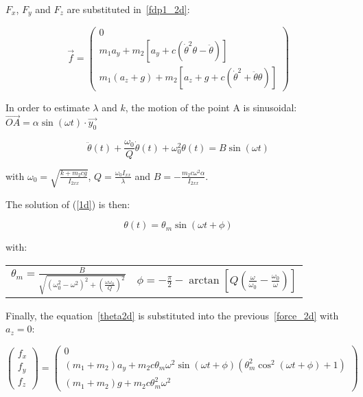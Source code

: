 \documentclass[\main/main.tex]{subfiles}
\begin{document}
$F_x$, $F_y$ and $F_z$ are substituted in~\eqref{fdp1_2d}:

\begin{equation}
  \label{force_2d}
  \overrightarrow{f}
  =
  \begin{pmatrix}
  0 \\
  m_1 a_y + m_2 [a_y + c (\dot{\theta}^2 \theta - \ddot{\theta})] \\
  m_1 (a_z + g) + m_2 [a_z + g + c (\dot{\theta}^2 + \ddot{\theta} \theta)]
  \end{pmatrix}
\end{equation}

In order to estimate $\lambda$ and $k$, the motion of the point A is sinusoidal: $\overrightarrow{OA} = \alpha \sin(\omega t) \cdot \overrightarrow{y_0}$

\begin{equation}
 \label{1d}
 \ddot{\theta}(t) + \frac{\omega_0}{Q} \dot{\theta}(t) + \omega_0^2 \theta(t) = B \sin(\omega t)
\end{equation}

with $\omega_0 = \sqrt{\frac{k + m_2 c g}{I_{2xx}}}$, $Q = \frac{\omega_0 I_{xx}}{\lambda}$ and $B = -\frac{m_2 c \omega^2 \alpha}{I_{2xx}}$.

The solution of (\ref{1d}) is then:


\begin{equation}
  \label{theta2d}
  \theta(t) = \theta_m \sin(\omega t + \phi)
\end{equation}


with:
{\centering
 \begin{tabular}{cc}
  $\theta_m = \frac{B}{\sqrt{{(\omega_0^2 - \omega^2)}^2 + {\left( \frac{\omega \omega_0}{Q}\right)}^2}}$
    & $\phi = - \frac{\pi}{2} - \arctan \left[ Q \left( \frac{\omega}{\omega_0} - \frac{\omega_0}{\omega} \right) \right] $ \\
 \end{tabular}
 \par}

\vspace{0.5cm}

Finally, the equation~\eqref{theta2d} is substituted into the previous~\eqref{force_2d} with $a_z = 0$:

\begin{equation*}
  \begin{pmatrix}
  f_x \\
  f_y \\
  f_z
  \end{pmatrix}
  =
  \begin{pmatrix}
  0 \\
  (m_1 + m_2) a_y + m_2 c \theta_m \omega^2 \sin(\omega t + \phi) (\theta_m^2 \cos^2(\omega t + \phi) + 1)  \\
  (m_1 + m_2) g + m_2 c \theta_m^2 \omega^2
  \end{pmatrix}
\end{equation*}
\end{document}
